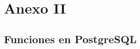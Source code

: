 \chapter{Anexo II}\label{anexoII}

\section*{Funciones en PostgreSQL}

\pagebreak
\pagebreak
\pagebreak
